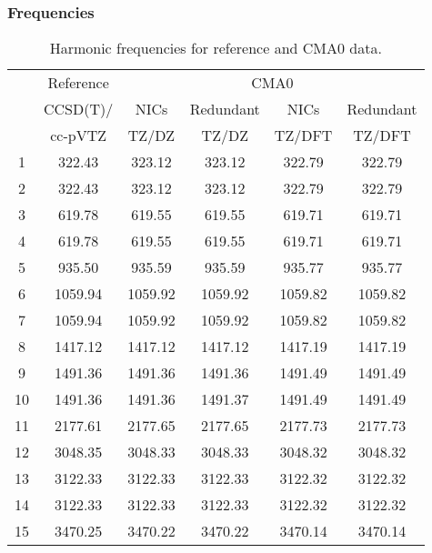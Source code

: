 \documentclass[10pt,oneside]{article}
\begin{document}
\begin{table}[h!]
\subsubsection*{Frequencies}
\centering
\caption{Harmonic frequencies for reference and CMA0 data.}
\begin{tabular}{cccccc}
\toprule
{} & Reference & \multicolumn{4}{c}{CMA0} \\
{} &  CCSD(T)/ &    NICs &  Redundant &    NICs & Redundant \\
{} &   cc-pVTZ &   TZ/DZ &      TZ/DZ &  TZ/DFT &    TZ/DFT \\
\midrule
1  &    322.43 &  323.12 &     323.12 &  322.79 &    322.79 \\
2  &    322.43 &  323.12 &     323.12 &  322.79 &    322.79 \\
3  &    619.78 &  619.55 &     619.55 &  619.71 &    619.71 \\
4  &    619.78 &  619.55 &     619.55 &  619.71 &    619.71 \\
5  &    935.50 &  935.59 &     935.59 &  935.77 &    935.77 \\
6  &   1059.94 & 1059.92 &    1059.92 & 1059.82 &   1059.82 \\
7  &   1059.94 & 1059.92 &    1059.92 & 1059.82 &   1059.82 \\
8  &   1417.12 & 1417.12 &    1417.12 & 1417.19 &   1417.19 \\
9  &   1491.36 & 1491.36 &    1491.36 & 1491.49 &   1491.49 \\
10 &   1491.36 & 1491.36 &    1491.37 & 1491.49 &   1491.49 \\
11 &   2177.61 & 2177.65 &    2177.65 & 2177.73 &   2177.73 \\
12 &   3048.35 & 3048.33 &    3048.33 & 3048.32 &   3048.32 \\
13 &   3122.33 & 3122.33 &    3122.33 & 3122.32 &   3122.32 \\
14 &   3122.33 & 3122.33 &    3122.33 & 3122.32 &   3122.32 \\
15 &   3470.25 & 3470.22 &    3470.22 & 3470.14 &   3470.14 \\
\bottomrule
\end{tabular}
\end{table}
\end{document}
